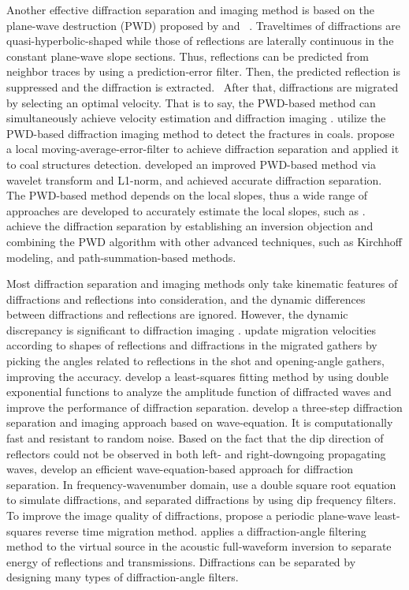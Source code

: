 \documentclass[10pt]{IEEEtran}
\begin{document}
Another effective diffraction separation and imaging method is based on the plane-wave destruction (PWD) proposed by \cite{Sergey2002Applications} and  \cite{2007Post}. Traveltimes of diffractions are quasi-hyperbolic-shaped while those of reflections are laterally continuous in the constant plane-wave slope sections. Thus, reflections can be predicted from neighbor traces by using a prediction-error filter. Then, the predicted reflection is suppressed and the diffraction is extracted.  After that, diffractions are migrated by selecting an optimal velocity. That is to say, the PWD-based method can simultaneously achieve velocity estimation and diffraction imaging \cite{2011Azimuthally}. 
\cite{2013Coal} utilize the PWD-based diffraction imaging method to detect the fractures in coals.
\cite{Binzhong2018seismic} propose a local moving-average-error-filter to achieve diffraction separation and applied it to coal structures detection. 
\cite{2018l1} developed an improved PWD-based method via wavelet transform and L1-norm, and achieved accurate diffraction separation.
The PWD-based method depends on the local slopes, thus a wide range of approaches are developed to accurately estimate the local slopes, such as \cite{2008Separation, 2010Nonlinear, 2018Dip}.
\cite{2020Least} achieve the diffraction separation by establishing an inversion objection and combining the PWD algorithm with other advanced techniques, such as Kirchhoff modeling, and path-summation-based methods.

Most diffraction separation and imaging methods only take kinematic features of diffractions and reflections into consideration, and the dynamic differences between diffractions and reflections are ignored. However, the dynamic discrepancy is significant to diffraction imaging \cite{2015Diffraction, 20193D, 2020Diffraction}.
\cite{2014Diffraction} update migration velocities according to shapes of reflections and diffractions in the migrated gathers by picking the angles related to reflections in the shot and opening-angle gathers, improving the accuracy.
\cite{2015Diffraction} develop a least-squares fitting method by using double exponential functions to analyze the amplitude function of diffracted waves and improve the performance of diffraction separation.
\cite{2016Imaging} develop a three-step diffraction separation and imaging approach based on wave-equation. It is computationally fast and resistant to random noise.
Based on the fact that the dip direction of reflectors could not be observed in both left- and right-downgoing propagating waves, \cite{2019Efficient} develop an efficient wave-equation-based approach for diffraction separation.
In frequency-wavenumber domain, \cite{2020Inspiration} use a double square root equation to simulate diffractions, and separated diffractions by using dip frequency filters.
To improve the image quality of diffractions, \cite{2020Periodic} propose a periodic plane-wave least-squares reverse time migration method.
\cite{2021Diffraction} applies a diffraction-angle filtering method to the virtual source in the acoustic full-waveform inversion to separate energy of reflections and transmissions. Diffractions can be separated by designing many types of diffraction-angle filters.
\end{document}
